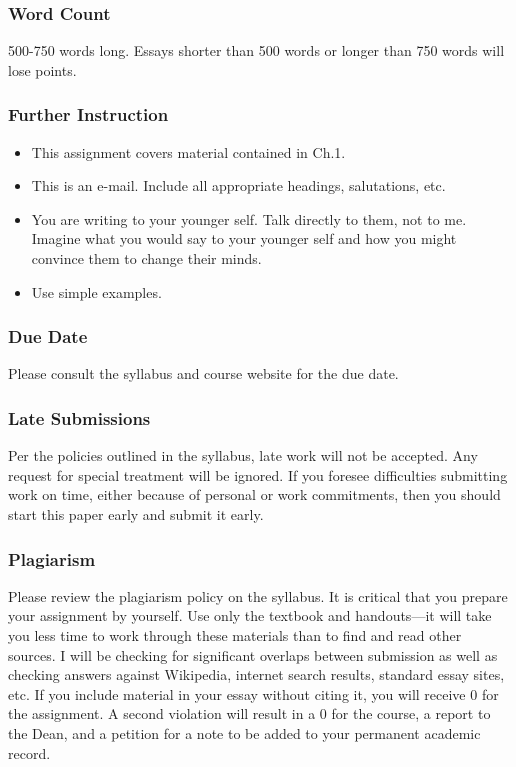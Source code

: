 \documentclass[10]{article}
\providecommand{\tightlist}{%
  \setlength{\itemsep}{0pt}\setlength{\parskip}{0pt}}
\begin{document}
\subsubsection{Word Count}\label{word-count}

 500-750 words long. Essays shorter than 500
words or longer than 750 words will lose points.

\subsubsection{Further Instruction}\label{further-instruction}

\begin{itemize}
\tightlist
\item
  This assignment covers material contained in Ch.1.
\item
  This is an e-mail. Include all appropriate headings,
  salutations, etc.
\item
  You are writing to your younger self. Talk directly to them, not to
  me. Imagine what you would say to your younger self and how you might
  convince them to change their minds.
\item
  Use simple examples.
\end{itemize}

\subsubsection{Due Date}\label{due-date}

Please consult the syllabus and course website for the due date.

\subsubsection{Late Submissions}\label{late-submissions}

Per the policies outlined in the syllabus, late work will not be
accepted. Any request for special treatment will be ignored. If you
foresee difficulties submitting work on time, either because of personal
or work commitments, then you should start this paper early and submit
it early.

\subsubsection{Plagiarism}\label{plagiarism}

Please review the plagiarism policy on the syllabus. It is critical that
you prepare your assignment by yourself. Use only the textbook and
handouts---it will take you less time to work through these materials
than to find and read other sources. I will be checking for significant
overlaps between submission as well as checking answers against
Wikipedia, internet search results, standard essay sites, etc. If you
include material in your essay without citing it, you will receive 0 for
the assignment. A second violation will result in a 0 for the course, a
report to the Dean, and a petition for a note to be added to your
permanent academic record.
\end{document}
